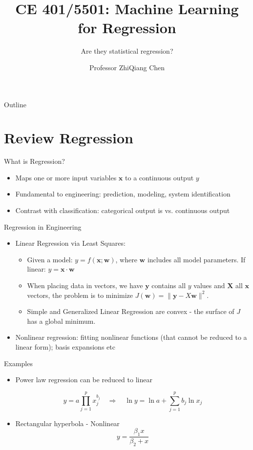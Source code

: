 \documentclass[german,10pt]{beamer}
\title{CE 401/5501: Machine Learning for Regression}
\subtitle{Are they statistical regression?}
\author[]{Professor ZhiQiang Chen}
\date{}
\institute[UMKC]
{
  School of Science and Engineering \\
  University of Missouri Kansas City
}
\begin{document}
\begin{frame}
  \titlepage
\end{frame}

\begin{frame}{Outline}
  \tableofcontents
\end{frame}

\section{Review Regression}
\begin{frame}{What is Regression?}
  \begin{itemize}
    \item Maps one or more input variables $\bm{x}$ to a continuous output $y$
    \item Fundamental to engineering: prediction, modeling, system identification
    \item Contrast with classification:  categorical output is vs. continuous output 
  \end{itemize}
\end{frame}

\begin{frame}{Regression in Engineering}
  \begin{itemize}
    \item Linear Regression via Least Squares: 
    \begin{itemize}
        \item Given a model: $y = f(\bm{x}; \bm{w})$, where $\bm{w}$ includes all model parameters. If linear: $y = \bm{x} \cdot \bm{w}$
        \item When placing data in vectors, we have $\bm{y}$ contains all $y$ values and $\bm{X}$ all $\bm{x}$ vectors, the problem is to minimize $J( \bm{w}) = \|\bm{y} - X  \bm{w}\|^2$.
         \item Simple and Generalized Linear Regression are convex - the surface of $J$ has a global minimum.
    \end{itemize}
   
    \item Nonlinear regression: fitting nonlinear functions (that cannot be reduced to a linear form); basis expansions etc
  \end{itemize}

      \begin{block}{Examples}
\begin{itemize}
    \item Power law regression can be reduced to linear
      
        \[
          y = a \prod_{j=1}^p x_j^{b_j}
          \quad\Longrightarrow\quad
          \ln y = \ln a + \sum_{j=1}^p b_j \ln x_j
        \]

  \item Rectangular hyperbola - Nonlinear
        \[
        y = \frac{\beta_1 x}{\beta_2 + x}
        \]
        
\end{itemize}
      \end{block}
      

\end{frame}
\end{document}
